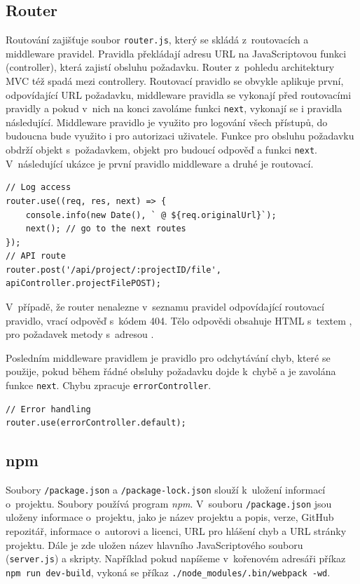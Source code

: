 \subsection{Router}
Routování zajišťuje soubor \texttt{router.js}, který se skládá z~routovacích a middleware pravidel. Pravidla překládají adresu URL na JavaScriptovou funkci (controller), která zajistí obsluhu požadavku. Router z~pohledu architektury MVC též spadá mezi controllery. Routovací pravidlo se obvykle aplikuje první, odpovídající URL požadavku, middleware pravidla se vykonají před routovacími pravidly a pokud v~nich na konci zavoláme funkci \texttt{next}, vykonají se i pravidla následující. Middleware pravidlo je využito pro logování všech přístupů, do budoucna bude využito i pro autorizaci uživatele. Funkce pro obsluhu požadavku obdrží objekt s~požadavkem, objekt pro budoucí odpověď a funkci \texttt{next}. V~následující ukázce je první pravidlo middleware a druhé je routovací.
\begin{lstlisting}[style=JavaScript]
// Log access
router.use((req, res, next) => {
    console.info(new Date(), ` @ ${req.originalUrl}`);
    next(); // go to the next routes
});
// API route
router.post('/api/project/:projectID/file', apiController.projectFilePOST);
\end{lstlisting}

V~případě, že router nenalezne v~seznamu pravidel odpovídající routovací pravidlo, vrací odpověď s~kódem 404. Tělo odpovědi obsahuje HTML s~textem , pro požadavek metody  s~adresou .

Posledním middleware pravidlem je pravidlo pro odchytávání chyb, které se použije, pokud během řádné obsluhy požadavku dojde k~chybě a je zavolána funkce \texttt{next}. Chybu zpracuje \texttt{errorController}.
\begin{lstlisting}[style=JavaScript]
// Error handling
router.use(errorController.default);
\end{lstlisting}

\subsection{npm}
Soubory \texttt{/package.json} a \texttt{/package-lock.json} slouží k~uložení informací o~projektu. Soubory používá program \textit{npm}. V~souboru \texttt{/package.json} jsou uloženy informace o~projektu, jako je název projektu a popis, verze, GitHub repozitář, informace o~autorovi a licenci, URL pro hlášení chyb a URL stránky projektu. Dále je zde uložen název hlavního JavaScriptového souboru (\texttt{server.js}) a skripty. Například pokud napíšeme v~kořenovém adresáři příkaz \texttt{npm run dev-build}, vykoná se příkaz \texttt{./node\_modules/.bin/webpack -wd}.

